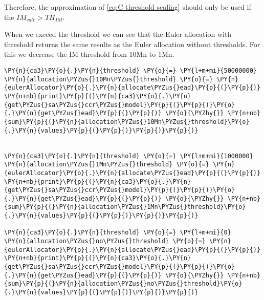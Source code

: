     Therefore, the approximation of \ref{eq:C threshold scaling} should only
be used if the \(IM_{calc} > TH_{IM}\).

When we exceed the threshold we can see that the Euler allocation with
threshold returns the same results as the Euler allocation without
thresholds. For this we decrease the IM threshold from 10Mn to 1Mn.

    \begin{tcolorbox}[breakable, size=fbox, boxrule=1pt, pad at break*=1mm,colback=cellbackground, colframe=cellborder]
\begin{Verbatim}[commandchars=\\\{\}]
\PY{n}{ca3}\PY{o}{.}\PY{n}{threshold} \PY{o}{=} \PY{l+m+mi}{50000000}
\PY{n}{allocation\PYZus{}10Mn\PYZus{}threshold} \PY{o}{=} \PY{n}{eulerAllocator}\PY{o}{.}\PY{n}{allocate\PYZus{}ead}\PY{p}{(}\PY{p}{)}
\PY{n+nb}{print}\PY{p}{(}\PY{n}{ca3}\PY{o}{.}\PY{n}{get\PYZus{}sa\PYZus{}ccr\PYZus{}model}\PY{p}{(}\PY{p}{)}\PY{o}{.}\PY{n}{get\PYZus{}ead}\PY{p}{(}\PY{p}{)} \PY{o}{\PYZhy{}} \PY{n+nb}{sum}\PY{p}{(}\PY{n}{allocation\PYZus{}10Mn\PYZus{}threshold}\PY{o}{.}\PY{n}{values}\PY{p}{(}\PY{p}{)}\PY{p}{)}\PY{p}{)}


\PY{n}{ca3}\PY{o}{.}\PY{n}{threshold} \PY{o}{=} \PY{l+m+mi}{1000000}
\PY{n}{allocation\PYZus{}1Mn\PYZus{}threshold} \PY{o}{=} \PY{n}{eulerAllocator}\PY{o}{.}\PY{n}{allocate\PYZus{}ead}\PY{p}{(}\PY{p}{)}
\PY{n+nb}{print}\PY{p}{(}\PY{n}{ca3}\PY{o}{.}\PY{n}{get\PYZus{}sa\PYZus{}ccr\PYZus{}model}\PY{p}{(}\PY{p}{)}\PY{o}{.}\PY{n}{get\PYZus{}ead}\PY{p}{(}\PY{p}{)} \PY{o}{\PYZhy{}} \PY{n+nb}{sum}\PY{p}{(}\PY{n}{allocation\PYZus{}1Mn\PYZus{}threshold}\PY{o}{.}\PY{n}{values}\PY{p}{(}\PY{p}{)}\PY{p}{)}\PY{p}{)}

\PY{n}{ca3}\PY{o}{.}\PY{n}{threshold} \PY{o}{=} \PY{l+m+mi}{0}
\PY{n}{allocation\PYZus{}no\PYZus{}threshold} \PY{o}{=} \PY{n}{eulerAllocator}\PY{o}{.}\PY{n}{allocate\PYZus{}ead}\PY{p}{(}\PY{p}{)}
\PY{n+nb}{print}\PY{p}{(}\PY{n}{ca3}\PY{o}{.}\PY{n}{get\PYZus{}sa\PYZus{}ccr\PYZus{}model}\PY{p}{(}\PY{p}{)}\PY{o}{.}\PY{n}{get\PYZus{}ead}\PY{p}{(}\PY{p}{)} \PY{o}{\PYZhy{}} \PY{n+nb}{sum}\PY{p}{(}\PY{n}{allocation\PYZus{}no\PYZus{}threshold}\PY{o}{.}\PY{n}{values}\PY{p}{(}\PY{p}{)}\PY{p}{)}\PY{p}{)}
\end{Verbatim}
\end{tcolorbox}


